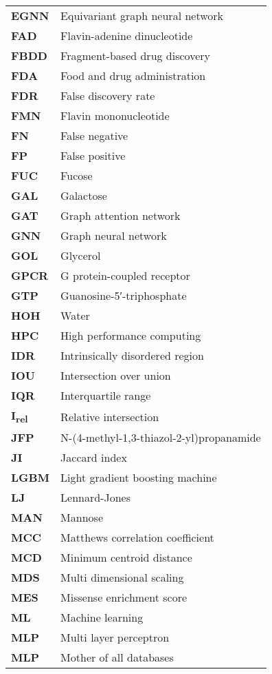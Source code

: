 \begin{longtable}[l]{@{}p{2.5cm}p{12cm}@{}}
\textbf{EGNN} & Equivariant graph neural network \\
\textbf{FAD} & Flavin-adenine dinucleotide \\
\textbf{FBDD} & Fragment-based drug discovery \\
\textbf{FDA} & Food and drug administration \\
\textbf{FDR} & False discovery rate \\
\textbf{FMN} & Flavin mononucleotide \\
\textbf{FN} & False negative \\
\textbf{FP} & False positive \\
\textbf{FUC} & Fucose \\
\textbf{GAL} & Galactose \\
\textbf{GAT} & Graph attention network \\
\textbf{GNN} & Graph neural network \\
\textbf{GOL} & Glycerol \\
\textbf{GPCR} & G protein-coupled receptor\\
\textbf{GTP} & Guanosine-5′-triphosphate \\
\textbf{HOH} & Water \\
\textbf{HPC} & High performance computing \\
\textbf{IDR} & Intrinsically disordered region \\
\textbf{IOU} & Intersection over union \\
\textbf{IQR} & Interquartile range \\
\textbf{I\textsubscript{rel}} & Relative intersection \\
\textbf{JFP} & N-(4-methyl-1,3-thiazol-2-yl)propanamide \\
\textbf{JI} & Jaccard index \\
\textbf{LGBM} & Light gradient boosting machine \\
\textbf{LJ} & Lennard-Jones \\
\textbf{MAN} & Mannose \\
\textbf{MCC} & Matthews correlation coefficient \\
\textbf{MCD} & Minimum centroid distance \\
\textbf{MDS} & Multi dimensional scaling \\
\textbf{MES} & Missense enrichment score \\
\textbf{ML} & Machine learning \\
\textbf{MLP} & Multi layer perceptron \\
\textbf{MLP} & Mother of all databases \\

\end{longtable}
